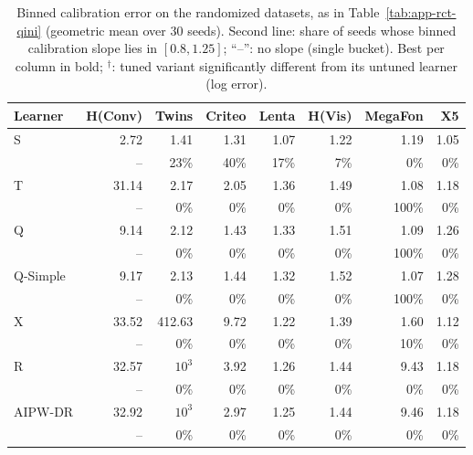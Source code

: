 \documentclass{article}
\begin{document}
\begin{table}[H]
\centering
\caption{Binned calibration error on the randomized datasets, as in
Table~\ref{tab:app-rct-qini} (geometric mean over $30$ seeds). Second line:
share of seeds whose binned calibration slope lies in $[0.8, 1.25]$; ``--'':
no slope (single bucket). Best per column in bold; $^\dagger$: tuned variant
significantly different from its untuned learner (log error).}
\label{tab:app-rct-cal}
\footnotesize
\setlength{\tabcolsep}{3pt}
\begin{tabular}{l|rrrrrrr}
\hline
Learner & H(Conv) & Twins & Criteo & Lenta & H(Vis) & MegaFon & X5 \\
\hline
S & 2.72 & 1.41 & 1.31 & 1.07 & 1.22 & 1.19 & 1.05 \\
 & \scriptsize -- & \scriptsize 23\% & \scriptsize 40\% & \scriptsize 17\% & \scriptsize 7\% & \scriptsize 0\% & \scriptsize 0\% \\[2pt]
T & 31.14 & 2.17 & 2.05 & 1.36 & 1.49 & 1.08 & 1.18 \\
 & \scriptsize -- & \scriptsize 0\% & \scriptsize 0\% & \scriptsize 0\% & \scriptsize 0\% & \scriptsize 100\% & \scriptsize 0\% \\[2pt]
\hline
Q & 9.14 & 2.12 & 1.43 & 1.33 & 1.51 & 1.09 & 1.26 \\
 & \scriptsize -- & \scriptsize 0\% & \scriptsize 0\% & \scriptsize 0\% & \scriptsize 0\% & \scriptsize 100\% & \scriptsize 0\% \\[2pt]
Q-Simple & 9.17 & 2.13 & 1.44 & 1.32 & 1.52 & 1.07 & 1.28 \\
 & \scriptsize -- & \scriptsize 0\% & \scriptsize 0\% & \scriptsize 0\% & \scriptsize 0\% & \scriptsize 100\% & \scriptsize 0\% \\[2pt]
\hline
X & 33.52 & 412.63 & 9.72 & 1.22 & 1.39 & 1.60 & 1.12 \\
 & \scriptsize -- & \scriptsize 0\% & \scriptsize 0\% & \scriptsize 0\% & \scriptsize 0\% & \scriptsize 10\% & \scriptsize 0\% \\[2pt]
R & 32.57 & $10^{3}$ & 3.92 & 1.26 & 1.44 & 9.43 & 1.18 \\
 & \scriptsize -- & \scriptsize 0\% & \scriptsize 0\% & \scriptsize 0\% & \scriptsize 0\% & \scriptsize 0\% & \scriptsize 0\% \\[2pt]
AIPW-DR & 32.92 & $10^{3}$ & 2.97 & 1.25 & 1.44 & 9.46 & 1.18 \\
 & \scriptsize -- & \scriptsize 0\% & \scriptsize 0\% & \scriptsize 0\% & \scriptsize 0\% & \scriptsize 0\% & \scriptsize 0\% \\[2pt]

\end{tabular}
\end{table}
\end{document}
